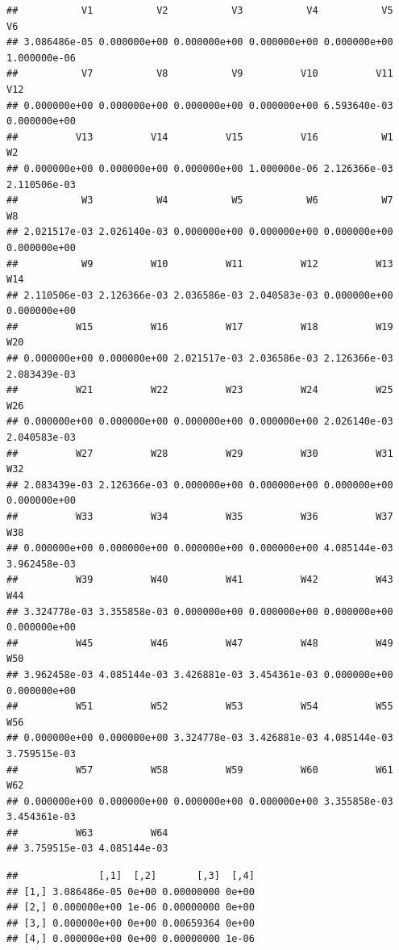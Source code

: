 \documentclass[
]{article}
\begin{document}
\begin{verbatim}
##           V1           V2           V3           V4           V5           V6 
## 3.086486e-05 0.000000e+00 0.000000e+00 0.000000e+00 0.000000e+00 1.000000e-06 
##           V7           V8           V9          V10          V11          V12 
## 0.000000e+00 0.000000e+00 0.000000e+00 0.000000e+00 6.593640e-03 0.000000e+00 
##          V13          V14          V15          V16           W1           W2 
## 0.000000e+00 0.000000e+00 0.000000e+00 1.000000e-06 2.126366e-03 2.110506e-03 
##           W3           W4           W5           W6           W7           W8 
## 2.021517e-03 2.026140e-03 0.000000e+00 0.000000e+00 0.000000e+00 0.000000e+00 
##           W9          W10          W11          W12          W13          W14 
## 2.110506e-03 2.126366e-03 2.036586e-03 2.040583e-03 0.000000e+00 0.000000e+00 
##          W15          W16          W17          W18          W19          W20 
## 0.000000e+00 0.000000e+00 2.021517e-03 2.036586e-03 2.126366e-03 2.083439e-03 
##          W21          W22          W23          W24          W25          W26 
## 0.000000e+00 0.000000e+00 0.000000e+00 0.000000e+00 2.026140e-03 2.040583e-03 
##          W27          W28          W29          W30          W31          W32 
## 2.083439e-03 2.126366e-03 0.000000e+00 0.000000e+00 0.000000e+00 0.000000e+00 
##          W33          W34          W35          W36          W37          W38 
## 0.000000e+00 0.000000e+00 0.000000e+00 0.000000e+00 4.085144e-03 3.962458e-03 
##          W39          W40          W41          W42          W43          W44 
## 3.324778e-03 3.355858e-03 0.000000e+00 0.000000e+00 0.000000e+00 0.000000e+00 
##          W45          W46          W47          W48          W49          W50 
## 3.962458e-03 4.085144e-03 3.426881e-03 3.454361e-03 0.000000e+00 0.000000e+00 
##          W51          W52          W53          W54          W55          W56 
## 0.000000e+00 0.000000e+00 3.324778e-03 3.426881e-03 4.085144e-03 3.759515e-03 
##          W57          W58          W59          W60          W61          W62 
## 0.000000e+00 0.000000e+00 0.000000e+00 0.000000e+00 3.355858e-03 3.454361e-03 
##          W63          W64 
## 3.759515e-03 4.085144e-03
\end{verbatim}

\begin{verbatim}
##              [,1]  [,2]       [,3]  [,4]
## [1,] 3.086486e-05 0e+00 0.00000000 0e+00
## [2,] 0.000000e+00 1e-06 0.00000000 0e+00
## [3,] 0.000000e+00 0e+00 0.00659364 0e+00
## [4,] 0.000000e+00 0e+00 0.00000000 1e-06
\end{verbatim}
\end{document}
